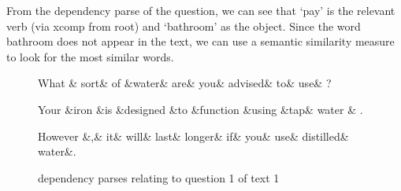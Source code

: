 \documentclass[12pt,a4paper]{article}
\begin{document}
From the dependency parse of the question, we can see that `pay' is the relevant verb (via xcomp from root) and `bathroom' as the object. Since the word bathroom does not appear in the text, we can use a semantic similarity measure to look for the most similar words.

\begin{figure}
\centering
\begin{dependency}
    \begin{deptext}[column sep=1em]
        What \& sort\& of \&water\& are\& you\& advised\& to\& use\& ? \\
    \end{deptext}
\end{dependency}

\begin{dependency}
    \begin{deptext}[column sep=1em]
        Your \&iron \&is \&designed \&to \&function \&using \&tap\& water \& . \\
    \end{deptext}
\end{dependency}

\begin{dependency}
    \begin{deptext}[column sep=1em]
        However \&,\& it\& will\& last\& longer\& if\& you\& use\& distilled\& water\&. \\
    \end{deptext}
\end{dependency}
\caption{dependency parses relating to question 1 of text 1}
\label{fig:deps-q1}
\end{figure}
\end{document}
